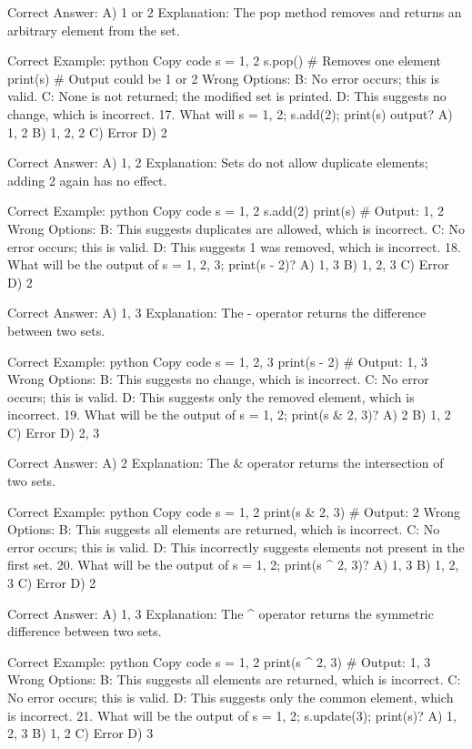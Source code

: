 Correct Answer: A) {1} or {2}
Explanation: The pop method removes and returns an arbitrary element from the set.

Correct Example:
python
Copy code
s = {1, 2}
s.pop()  # Removes one element
print(s)  # Output could be {1} or {2}
Wrong Options:
B: No error occurs; this is valid.
C: None is not returned; the modified set is printed.
D: This suggests no change, which is incorrect.
17. What will s = {1, 2}; s.add(2); print(s) output?
A) {1, 2}
B) {1, 2, 2}
C) Error
D) {2}

Correct Answer: A) {1, 2}
Explanation: Sets do not allow duplicate elements; adding 2 again has no effect.

Correct Example:
python
Copy code
s = {1, 2}
s.add(2)
print(s)  # Output: {1, 2}
Wrong Options:
B: This suggests duplicates are allowed, which is incorrect.
C: No error occurs; this is valid.
D: This suggests 1 was removed, which is incorrect.
18. What will be the output of s = {1, 2, 3}; print(s - {2})?
A) {1, 3}
B) {1, 2, 3}
C) Error
D) {2}

Correct Answer: A) {1, 3}
Explanation: The - operator returns the difference between two sets.

Correct Example:
python
Copy code
s = {1, 2, 3}
print(s - {2})  # Output: {1, 3}
Wrong Options:
B: This suggests no change, which is incorrect.
C: No error occurs; this is valid.
D: This suggests only the removed element, which is incorrect.
19. What will be the output of s = {1, 2}; print(s & {2, 3})?
A) {2}
B) {1, 2}
C) Error
D) {2, 3}

Correct Answer: A) {2}
Explanation: The & operator returns the intersection of two sets.

Correct Example:
python
Copy code
s = {1, 2}
print(s & {2, 3})  # Output: {2}
Wrong Options:
B: This suggests all elements are returned, which is incorrect.
C: No error occurs; this is valid.
D: This incorrectly suggests elements not present in the first set.
20. What will be the output of s = {1, 2}; print(s ^ {2, 3})?
A) {1, 3}
B) {1, 2, 3}
C) Error
D) {2}

Correct Answer: A) {1, 3}
Explanation: The ^ operator returns the symmetric difference between two sets.

Correct Example:
python
Copy code
s = {1, 2}
print(s ^ {2, 3})  # Output: {1, 3}
Wrong Options:
B: This suggests all elements are returned, which is incorrect.
C: No error occurs; this is valid.
D: This suggests only the common element, which is incorrect.
21. What will be the output of s = {1, 2}; s.update({3}); print(s)?
A) {1, 2, 3}
B) {1, 2}
C) Error
D) {3}


